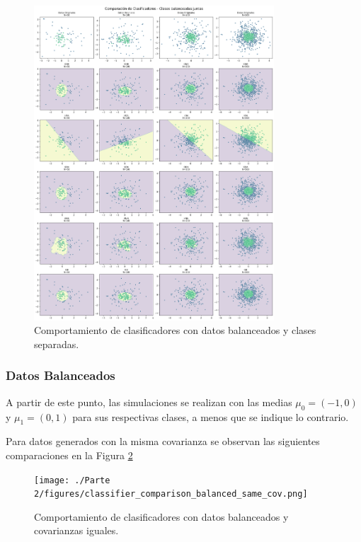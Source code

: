 \documentclass[10pt]{article}
\begin{document}
\begin{figure}[ht]
    \centering
    \includegraphics[width=0.8\textwidth]{./Parte 2/figures/classifier_comparison_balanced_joined_classes.png}
    \caption{Comportamiento de clasificadores con datos balanceados y clases separadas.}    
    \label{fig:classifier-comparison-balanced-joined-classes}
\end{figure}


\subsubsection*{Datos Balanceados}


A partir de este punto, las simulaciones se realizan con las medias
$\mu_0=(-1,0)$ y $\mu_1=(0, 1)$ para sus respectivas clases, a menos que se
indique lo contrario.

Para datos generados con la misma covarianza se observan las siguientes
comparaciones en la Figura \ref{fig:classifier-comparison-balanced-same-cov}

\begin{figure}[ht]
    \centering
    \texttt{[image: ./Parte 2/figures/classifier\_comparison\_balanced\_same\_cov.png]}
    \caption{Comportamiento de clasificadores con datos balanceados y covarianzas iguales.}    
    \label{fig:classifier-comparison-balanced-same-cov}
\end{figure}
\end{document}
